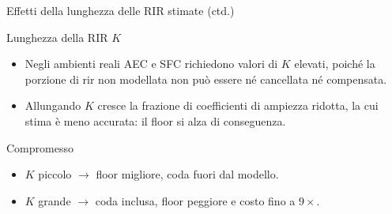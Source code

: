 \documentclass[aspectratio=169,xcolor=dvipsnames]{beamer}
\begin{document}
\begin{frame}{Effetti della lunghezza delle RIR stimate (ctd.)}
    \begin{alertblock}{Lunghezza della RIR $K$}
        \begin{itemize}
            \item Negli ambienti reali AEC e SFC richiedono valori di $K$ elevati, poiché la porzione di \ac{rir} non modellata non può essere né cancellata né compensata.
            \item Allungando $K$ cresce la frazione di coefficienti di ampiezza ridotta, la cui stima è meno accurata: il floor si alza di conseguenza.
        \end{itemize}
    \end{alertblock}

    \begin{exampleblock}{Compromesso}
        \begin{itemize}
            \item $K$ piccolo $\rightarrow$ floor migliore, coda fuori dal modello.
            \item $K$ grande $\rightarrow$ coda inclusa, floor peggiore e costo fino a $9\times$.
        \end{itemize}
    \end{exampleblock}
\end{frame}
\end{document}
